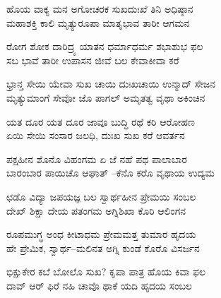 
\begin{myquote}
ಹೊಯ ವಾಕ್ಯ ಮನ ಅಗೋಚರಕ ಸುಖದುಃಖೆ ತಿನಿ ಅಧಿಷ್ಠಾನ\\ಮಹಾಶಕ್ತಿ ಕಾಲಿ ಮೃತ್ಯುರೂಪಾ ಮಾತೃಭಾವ ತಾರೀ ಆಗಮನ
\end{myquote}


\begin{myquote}
ರೋಗ ಶೋಕ ದಾರಿದ್ರ್ಯ ಯಾತನ ಧರ್ಮಾಧರ್ಮ ಶಭಾಶುಭ ಫಲ\\ಸಬ ಭಾವೆ ತಾರೀ ಉಪಾಸನ ಜೀವೆ ಬಲ ಕೇವಾಕೀವಾ ಕರೆ
\end{myquote}


\begin{myquote}
ಭ್ರಾನ್ತ ಸೇಯಿ ಯೇವಾ ಸುಖ ಚಾಯಿ ದುಃಖಚಾಯಿ ಉನ್ಮಾದ್ ಸೇಜನ\\ಮೃತ್ಯುಮಾಂಗೆ ಸೇವೋ ಜೊ ಪಾಗಲ್ ಅಮೃತತ್ವ ವೃಥಾ ಅಕಿಂಚಿನ
\end{myquote}


\begin{myquote}
ಯತ ದೂರ ಯತ ದೂರ ಜಾವೂ ಬುದ್ಧಿ ರಥೆ ಕರಿ ಆರೋಹಣ\\ಏಯಿ ಸೇಯಿ ಸಂಸಾರ ಜಲಧಿ, ದುಃಖ ಸುಖ ಕರೆ ಆವರ್ತನ
\end{myquote}


\begin{myquote}
ಪಕ್ಷಹೀನ ಶೊನೊ ವಿಹಂಗಮ ಏ ಜೆ ನಹೆ ಪಥ ಪಾಲಾಬಾರ\\ಬಾರಂಬಾರ ಪಾಯಿಚೊ ಆಘಾತ್ –ಕೆನೊ ಕರೊ ವೃಥಾಯ ಉದ್ಯಮ
\end{myquote}


\begin{myquote}
ಛಡೊ ವಿದ್ಯಾ ಜಪಯಜ್ಞ ಬಲ ಸ್ವಾರ್ಥಹೀನ ಪ್ರೇಮಯಿ ಸಂಬಲ\\ದೇಖ್ ಶಿಕ್ಷಾ ದೇಯ ಪತಂಗಮ ಅಗ್ನಿಶಿಖಾ ಕೊರಿ ಆಲಿಂಗನ
\end{myquote}


\begin{myquote}
ರೂಪಮುಗ್ಧ ಅಂಧ ಕೀಟಾಧಮ ಪ್ರೇಮಮತ್ತ ತುಮಾರ ಹೃದಯ\\ಹೇ ಪ್ರೇಮಿಕ, ಸ್ವಾರ್ಥ–ಮಲಿನತ ಅಗ್ನಿ ಕುಂಡೆ ಕೊರೊ ವಿಸರ್ಜನ
\end{myquote}


\begin{myquote}
ಭಿಕ್ಷುಕೇರ ಕಬೆ ಬೋಲೊ ಸುಖ? ಕೃಪಾ ಪಾತ್ರ ಹೊಯ ಕಿವಾ ಫಲ\\ದಾವ್ ಆರ್ ಫಿರೆ ನಹಿ ಚಾವೊ ಥಾಕೆ ಯದಿ ಹೃದಯ ಸಂಬಲ
\end{myquote}

